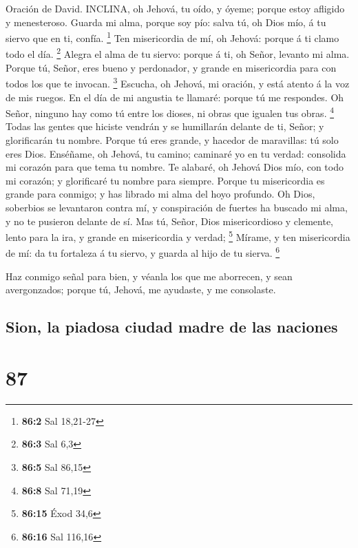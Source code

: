  Oración de David. INCLINA, oh Jehová, tu oído, y óyeme;
porque estoy afligido y menesteroso.  Guarda mi alma, porque
soy pío: salva tú, oh Dios mío, á tu siervo que en ti, confía.
\footnote{\textbf{86:2} Sal 18,21-27}  Ten misericordia de
mí, oh Jehová: porque á ti clamo todo el día. \footnote{\textbf{86:3}
  Sal 6,3}  Alegra el alma de tu siervo: porque á ti, oh
Señor, levanto mi alma.  Porque tú, Señor, eres bueno y
perdonador, y grande en misericordia para con todos los que te invocan.
\footnote{\textbf{86:5} Sal 86,15}  Escucha, oh Jehová, mi
oración, y está atento á la voz de mis ruegos.  En el día de
mi angustia te llamaré: porque tú me respondes.  Oh Señor,
ninguno hay como tú entre los dioses, ni obras que igualen tus obras.
\footnote{\textbf{86:8} Sal 71,19}  Todas las gentes que
hiciste vendrán y se humillarán delante de ti, Señor; y glorificarán tu
nombre.  Porque tú eres grande, y hacedor de maravillas: tú
solo eres Dios.  Enséñame, oh Jehová, tu camino; caminaré
yo en tu verdad: consolida mi corazón para que tema tu nombre.
 Te alabaré, oh Jehová Dios mío, con todo mi corazón; y
glorificaré tu nombre para siempre.  Porque tu misericordia
es grande para conmigo; y has librado mi alma del hoyo profundo.
 Oh Dios, soberbios se levantaron contra mí, y conspiración
de fuertes ha buscado mi alma, y no te pusieron delante de sí.
 Mas tú, Señor, Dios misericordioso y clemente, lento para
la ira, y grande en misericordia y verdad; \footnote{\textbf{86:15} Éxod
  34,6}  Mírame, y ten misericordia de mí: da tu fortaleza
á tu siervo, y guarda al hijo de tu sierva. \footnote{\textbf{86:16} Sal
  116,16}

 Haz conmigo señal para bien, y véanla los que me
aborrecen, y sean avergonzados; porque tú, Jehová, me ayudaste, y me
consolaste.

\hypertarget{sion-la-piadosa-ciudad-madre-de-las-naciones}{%
\subsection{Sion, la piadosa ciudad madre de las
naciones}\label{sion-la-piadosa-ciudad-madre-de-las-naciones}}

\hypertarget{section-86}{%
\section{87}\label{section-86}}

